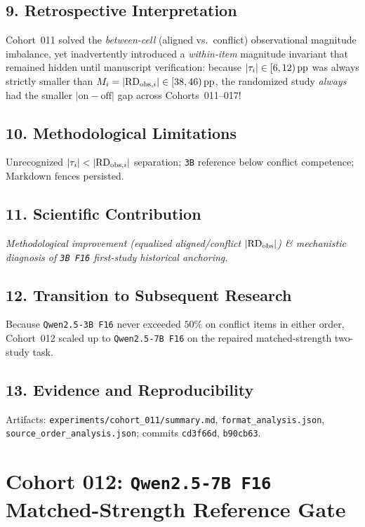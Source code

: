 \subsection*{9. Retrospective Interpretation}
Cohort~011 solved the \emph{between-cell} (aligned vs.\ conflict) observational magnitude imbalance, yet inadvertently introduced a \emph{within-item} magnitude invariant that remained hidden until manuscript verification: because $|\tau_i| \in [6,12)\,\mathrm{pp}$ was always strictly smaller than $M_i = |\mathrm{RD}_{\mathrm{obs},i}| \in [38,46)\,\mathrm{pp}$, the randomized study \emph{always} had the smaller $|\text{on}-\text{off}|$ gap across Cohorts~011--017!

\subsection*{10. Methodological Limitations}
Unrecognized $|\tau_i| < |\mathrm{RD}_{\mathrm{obs},i}|$ separation; \texttt{3B} reference below conflict competence; Markdown fences persisted.

\subsection*{11. Scientific Contribution}
\emph{Methodological improvement (equalized aligned/conflict $|\mathrm{RD}_{\mathrm{obs}}|$) \& mechanistic diagnosis of \texttt{3B F16} first-study historical anchoring.}

\subsection*{12. Transition to Subsequent Research}
Because \texttt{Qwen2.5-3B F16} never exceeded $50\%$ on conflict items in either order, Cohort~012 scaled up to \texttt{Qwen2.5-7B F16} on the repaired matched-strength two-study task.

\subsection*{13. Evidence and Reproducibility}
Artifacts: \texttt{experiments/cohort\_011/summary.md}, \texttt{format\_analysis.json}, \texttt{source\_order\_analysis.json}; commits \texttt{cd3f66d}, \texttt{b90cb63}.

\section{Cohort 012: \texttt{Qwen2.5-7B F16} Matched-Strength Reference Gate}

